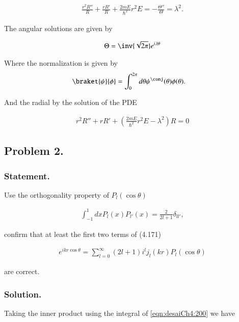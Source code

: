\begin{align}\label{eqn:desaiCh4:152}
\frac{r^2 R''}{R} + \frac{r R'}{R} + \frac{2 m E}{\hbar^2} r^2 E = -\frac{\Theta''}{\Theta} = \lambda^2.
\end{align}

The angular solutions are given by 

\begin{align}\label{eqn:desaiCh4:153}
\Theta = \inv{\sqrt{2\pi}} e^{i \lambda \theta}
\end{align}

Where the normalization is given by 
\begin{align}\label{eqn:desaiCh4:160}
\braket{\psi}{\phi} &= 
\int_{0}^{2 \pi} d\theta \psi^\conj(\theta) \phi(\theta).
\end{align}

And the radial by the solution of the PDE

\begin{align}\label{eqn:desaiCh4:154}
r^2 R'' + r R' + \left( \frac{2 m E}{\hbar^2} r^2 E - \lambda^2 \right) R = 0
\end{align}

\subsection{Problem 2.}
\subsubsection{Statement.}

Use the orthogonality property of $P_l(\cos\theta)$

\begin{align}\label{eqn:desaiCh4:200}
\int_{-1}^1 dx P_l(x) P_{l'}(x) = \frac{2}{2l+1} \delta_{l l'},
\end{align}

confirm that at least the first two terms of (4.171)

\begin{align}\label{eqn:desaiCh4:201}
e^{i k r \cos\theta} = \sum_{l=0}^\infty (2l + 1) i^l j_l(kr) P_l(\cos\theta)
\end{align}

are correct.

\subsubsection{Solution.}

Taking the inner product using the integral of \ref{eqn:desaiCh4:200} we have

